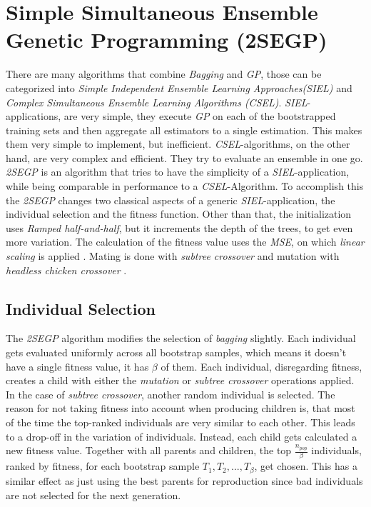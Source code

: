 \documentclass[tikz, runningheads]{llncs}
\begin{document}
\section{Simple Simultaneous Ensemble Genetic Programming (2SEGP)}
\label{section2SEGP}
There are many algorithms that combine \textit{Bagging} and \textit{GP}, those can be categorized into
\textit{Simple Independent Ensemble Learning Approaches(SIEL)} and \textit{Complex Simultaneous Ensemble
Learning Algorithms (CSEL)}. \textit{SIEL}-applications, are very simple, they execute \textit{GP} on each of the 
bootstrapped training sets and then aggregate all estimators to a single estimation. This makes 
them very simple to implement, but inefficient.
\textit{CSEL}-algorithms, on the other hand, are very complex and efficient. They try to evaluate an ensemble in one go.
\textit{2SEGP} is an algorithm that tries to have the simplicity of a \textit{SIEL}-application, while being 
comparable in performance to a \textit{CSEL}-Algorithm. To accomplish this the \textit{2SEGP} changes two classical
aspects of a generic \textit{SIEL}-application, the individual selection and the fitness function.
Other than that, the initialization uses \textit{Ramped half-and-half}, but it increments the depth of the trees, to get 
even more variation. The calculation of the fitness value uses the \textit{MSE}, on which \textit{linear scaling} is applied \cite{LinearScaling}. 
Mating is done with \textit{subtree crossover} and mutation with \textit{headless chicken crossover} \cite{GPoriginal}. 

\subsection{Individual Selection}
The \textit{2SEGP} algorithm modifies the selection of \textit{bagging} slightly. Each individual gets evaluated uniformly 
across all bootstrap samples, which means it doesn't have a single fitness value, it has $\beta$ of them. 
Each individual, disregarding fitness, creates a child with either the \textit{mutation} or \textit{subtree crossover} operations applied. 
In the case of \textit{subtree crossover}, another random individual is selected. The reason for not taking 
fitness into account when producing children is, that most of the time the top-ranked individuals 
are very similar to each other. This leads to a drop-off in the variation of individuals.
Instead, each child gets calculated a new fitness value. Together with all parents and children, the top $\frac{n_{pop}}{\beta}$ 
individuals, ranked by fitness, for each bootstrap sample $T_1, T_2, ..., T_\beta$, get chosen. This has a similar effect as 
just using the best parents for reproduction since bad individuals are not selected for the next generation. 
\end{document}
